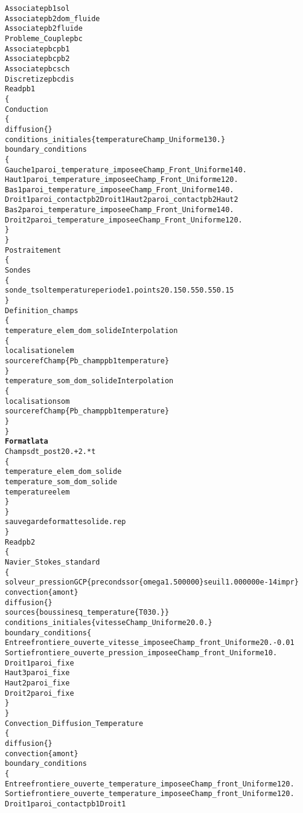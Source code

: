 \begin{alltt}
Associate pb1 sol
Associate pb2 dom_fluide
Associate pb2 fluide
Probleme_Couple pbc
Associate pbc pb1
Associate pbc pb2
Associate pbc sch
Discretize pbc dis
Read pb1
\{
    Conduction
    \{
        diffusion \{ \}
        conditions_initiales \{ temperature Champ_Uniforme 1 30. \}
        boundary_conditions
        \{
            Gauche1 paroi_temperature_imposee   Champ_Front_Uniforme 1 40.
            Haut1   paroi_temperature_imposee   Champ_Front_Uniforme 1 20.
            Bas1    paroi_temperature_imposee   Champ_Front_Uniforme 1 40.
            Droit1  paroi_contact pb2  Droit1   Haut2   paroi_contact pb2  Haut2
            Bas2    paroi_temperature_imposee   Champ_Front_Uniforme 1 40.
            Droit2  paroi_temperature_imposee   Champ_Front_Uniforme 1 20.
        \}
    \}
    Postraitement
    \{
        Sondes
        \{
            sonde_tsol temperature periode 1. points 2     0.15 0.55     0.55 0.15 
        \}
        Definition_champs 
        \{
            temperature_elem_dom_solide Interpolation
            \{
                localisation elem
                source refChamp \{ Pb_champ pb1 temperature \}
            \}
            temperature_som_dom_solide Interpolation 
            \{
                localisation som
                source refChamp \{ Pb_champ pb1 temperature \}
            \}
        \}
        {\bf{Format lata}}
        Champs dt_post 20.+2.*t
        \{
            temperature_elem_dom_solide
            temperature_som_dom_solide
            temperature elem
        \}
    \}
    sauvegarde formatte solide.rep
\}
Read pb2
\{
    Navier_Stokes_standard
    \{
        solveur_pression GCP \{ precond ssor \{ omega 1.500000 \} seuil 1.000000e-14 impr \}
        convection \{ amont \}
        diffusion \{ \}
        sources \{ boussinesq_temperature \{ T0 30. \} \}
        conditions_initiales \{ vitesse Champ_Uniforme 2 0. 0. \}
        boundary_conditions \{
            Entree frontiere_ouverte_vitesse_imposee    Champ_front_Uniforme 2 0. -0.01
            Sortie frontiere_ouverte_pression_imposee   Champ_front_Uniforme 1 0.
            Droit1 paroi_fixe
            Haut3  paroi_fixe
            Haut2  paroi_fixe
            Droit2 paroi_fixe
        \}
    \}
    Convection_Diffusion_Temperature
    \{
        diffusion \{ \}
        convection \{ amont \}
        boundary_conditions 
        \{
            Entree frontiere_ouverte_temperature_imposee    Champ_front_Uniforme 1 20.
            Sortie frontiere_ouverte_temperature_imposee    Champ_front_Uniforme 1 20.
            Droit1 paroi_contact pb1  Droit1

\end{alltt}
